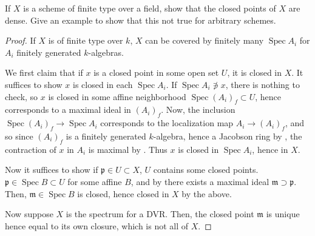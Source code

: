 \documentclass[10pt]{article}
\theoremstyle{definition}
\theoremstyle{remark}
\numberwithin{equation}{section}
\numberwithin{figure}{subsubsection}
\DeclareMathOperator{\Spec}{Spec}
\begin{document}
\begin{problem}
  If $X$ is a scheme of finite type over a field, show that the closed points of $X$ are dense. Give an example to show that this not true for arbitrary schemes.
\end{problem}
\begin{proof}
  If $X$ is of finite type over $k$, $X$ can be covered by finitely many $\Spec A_i$ for $A_i$ finitely generated $k$-algebras.
  \par We first claim that if $x$ is a closed point in some open set $U$, it is closed in $X$. It suffices to show $x$ is closed in each $\Spec A_i$. If $\Spec A_i \not\ni x$, there is nothing to check, so $x$ is closed in some affine neighborhood $\Spec (A_i)_f \subset U$, hence corresponds to a maximal ideal in $(A_i)_f$. Now, the inclusion $\Spec (A_i)_f \to \Spec A_i$ corresponds to the localization map $A_i \to (A_i)_f$, and so since $(A_i)_f$ is a finitely generated $k$-algebra, hence a Jacobson ring by \cite[Ex.~5.24]{AM69}, the contraction of $x$ in $A_i$ is maximal by \cite[Thm.~4.19]{Eis95}. Thus $x$ is closed in $\Spec A_i$, hence in $X$.
  \par Now it suffices to show if $\mathfrak{p} \in U \subset X$, $U$ contains some closed points. $\mathfrak{p} \in \Spec B \subset U$ for some affine $B$, and by \cite[Cor.~1.4]{AM69} there exists a maximal ideal $\mathfrak{m} \supset \mathfrak{p}$. Then, $\mathfrak{m} \in \Spec B$ is closed, hence closed in $X$ by the above.
  \par Now suppose $X$ is the spectrum for a DVR. Then, the closed point $\mathfrak{m}$ is unique hence equal to its own closure, which is not all of $X$.
\end{proof}
\end{document}
